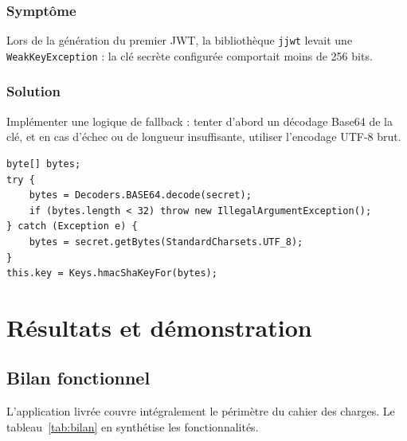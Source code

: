 \documentclass[11pt,a4paper,oneside]{report}
\begin{document}
\subsection{Symptôme}
Lors de la génération du premier JWT, la bibliothèque \texttt{jjwt} levait
une \texttt{WeakKeyException} : la clé secrète configurée comportait moins
de 256 bits.

\subsection{Solution}
Implémenter une logique de fallback : tenter d'abord un décodage Base64
de la clé, et en cas d'échec ou de longueur insuffisante, utiliser
l'encodage UTF-8 brut.

\begin{lstlisting}[style=javastyle]
byte[] bytes;
try {
    bytes = Decoders.BASE64.decode(secret);
    if (bytes.length < 32) throw new IllegalArgumentException();
} catch (Exception e) {
    bytes = secret.getBytes(StandardCharsets.UTF_8);
}
this.key = Keys.hmacShaKeyFor(bytes);
\end{lstlisting}

\chapter{Résultats et démonstration}

\section{Bilan fonctionnel}

L'application livrée couvre intégralement le périmètre du cahier des
charges. Le tableau~\ref{tab:bilan} en synthétise les fonctionnalités.
\end{document}
